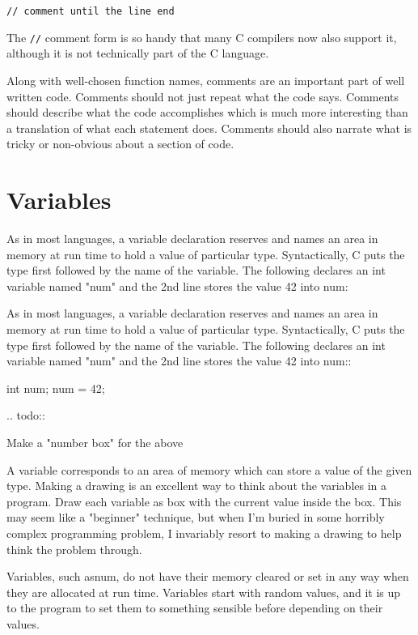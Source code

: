 \begin{lstlisting}
// comment until the line end
\end{lstlisting}

The \lstinline{//} comment form is so handy that many C compilers now also support it, although it is not technically part of the C language.

Along with well-chosen function names, comments are an important part of well written code. Comments should not just repeat what the code says. Comments should describe what the code accomplishes which is much more interesting than a translation of what each statement does. Comments should also narrate what is tricky or non-obvious about a section of code.

\section{Variables}

As in most languages, a variable declaration reserves and names an area in memory at run time to hold a value of particular type. Syntactically, C puts the type first followed by the name of the variable. The following declares an int variable named "num" and the 2nd line stores the value 42 into num:

As in most languages, a variable declaration reserves and names an area in memory at run time to hold a value of particular type. Syntactically, C puts the type first followed by the name of the variable. The following declares an int variable named "num" and the 2nd line stores the value 42 into num::

   int num;
   num = 42;

.. todo::

   Make a "number box" for the above
   
A variable corresponds to an area of memory which can store a value of the given type. Making a drawing is an excellent way to think about the variables in a program. Draw each variable as box with the current value inside the box. This may seem like a "beginner" technique, but when I'm buried in some horribly complex programming problem, I invariably resort to making a drawing to help think the problem through.

Variables, such asnum, do not have their memory cleared or set in any way when they are allocated at run time. Variables start with random values, and it is up to the program to set them to something sensible before depending on their values.

